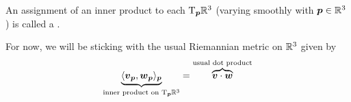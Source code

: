 \begin{definition}
An assignment of an inner product to each $\mathrm{T}_{\boldsymbol{p}}\mathbb{R}^{3}$ (varying
smoothly with $\boldsymbol{p}\in\mathbb{R}^{3}$) is called a .
\end{definition}

\begin{example}
For now, we will be sticking with the usual Riemannian metric on
$\mathbb{R}^{3}$ given by
\begin{equation}
\underbrace{\langle\boldsymbol{v}_{\boldsymbol{p}},\boldsymbol{w}_{\boldsymbol{p}}\rangle_{\boldsymbol{p}}}_{\text{inner product on }\mathrm{T}_{\boldsymbol{p}}\mathbb{R}^{3}}=
\overbrace{\boldsymbol{v}\cdot\boldsymbol{w}}^{\text{usual dot product}}
\end{equation}
\end{example}